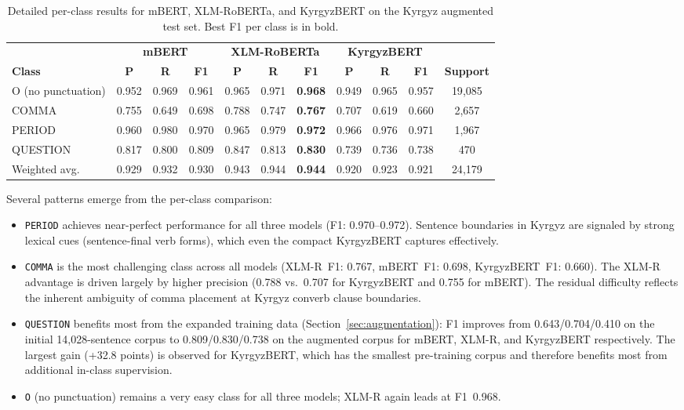 \documentclass[manuscript, review]{acmart}
\begin{document}
\begin{table}[t]
\caption{Detailed per-class results for mBERT, XLM-RoBERTa, and KyrgyzBERT on the Kyrgyz augmented test set. Best F1 per class is in bold.}
\label{tab:detail-both}
\small
\begin{tabular}{l ccc ccc ccc c}
\toprule
 & \multicolumn{3}{c}{\textbf{mBERT}} & \multicolumn{3}{c}{\textbf{XLM-RoBERTa}} & \multicolumn{3}{c}{\textbf{KyrgyzBERT}} & \\
\cmidrule(lr){2-4} \cmidrule(lr){5-7} \cmidrule(lr){8-10}
\textbf{Class} & \textbf{P} & \textbf{R} & \textbf{F1} & \textbf{P} & \textbf{R} & \textbf{F1} & \textbf{P} & \textbf{R} & \textbf{F1} & \textbf{Support} \\
\midrule
O (no punctuation) & 0.952 & 0.969 & 0.961          & 0.965 & 0.971 & \textbf{0.968} & 0.949 & 0.965 & 0.957 & 19{,}085 \\
COMMA              & 0.755 & 0.649 & 0.698          & 0.788 & 0.747 & \textbf{0.767} & 0.707 & 0.619 & 0.660 & 2{,}657 \\
PERIOD             & 0.960 & 0.980 & 0.970          & 0.965 & 0.979 & \textbf{0.972} & 0.966 & 0.976 & 0.971 & 1{,}967 \\
QUESTION           & 0.817 & 0.800 & 0.809          & 0.847 & 0.813 & \textbf{0.830} & 0.739 & 0.736 & 0.738 & 470 \\
\midrule
Weighted avg.      & 0.929 & 0.932 & 0.930          & 0.943 & 0.944 & \textbf{0.944} & 0.920 & 0.923 & 0.921 & 24{,}179 \\
\bottomrule
\end{tabular}
\end{table}

Several patterns emerge from the per-class comparison:

\begin{itemize}
    \item \texttt{PERIOD} achieves near-perfect performance for all three models (F1: 0.970--0.972). Sentence boundaries in Kyrgyz are signaled by strong lexical cues (sentence-final verb forms), which even the compact KyrgyzBERT captures effectively.
    \item \texttt{COMMA} is the most challenging class across all models (XLM-R~F1: 0.767, mBERT~F1: 0.698, KyrgyzBERT~F1: 0.660). The XLM-R advantage is driven largely by higher precision (0.788 vs.\ 0.707 for KyrgyzBERT and 0.755 for mBERT). The residual difficulty reflects the inherent ambiguity of comma placement at Kyrgyz converb clause boundaries.
    \item \texttt{QUESTION} benefits most from the expanded training data (Section~\ref{sec:augmentation}): F1 improves from 0.643/0.704/0.410 on the initial 14{,}028-sentence corpus to 0.809/0.830/0.738 on the augmented corpus for mBERT, XLM-R, and KyrgyzBERT respectively. The largest gain (+32.8 points) is observed for KyrgyzBERT, which has the smallest pre-training corpus and therefore benefits most from additional in-class supervision.
    \item \texttt{O} (no punctuation) remains a very easy class for all three models; XLM-R again leads at F1~0.968.
\end{itemize}
\end{document}
